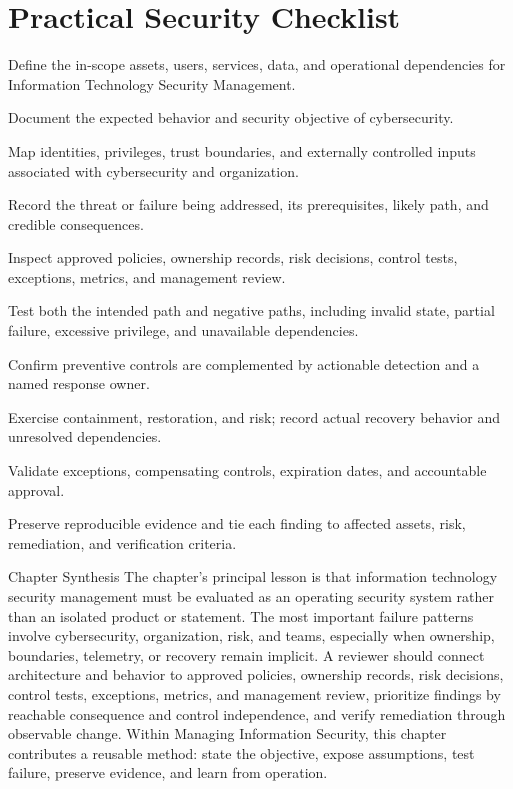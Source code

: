 \documentclass[11pt,letterpaper]{article}
\begin{document}
\section*{Practical Security Checklist}
\begin{CornellChecklist}
\item Define the in-scope assets, users, services, data, and operational dependencies for Information Technology Security Management.
\item Document the expected behavior and security objective of cybersecurity.
\item Map identities, privileges, trust boundaries, and externally controlled inputs associated with cybersecurity and organization.
\item Record the threat or failure being addressed, its prerequisites, likely path, and credible consequences.
\item Inspect approved policies, ownership records, risk decisions, control tests, exceptions, metrics, and management review.
\item Test both the intended path and negative paths, including invalid state, partial failure, excessive privilege, and unavailable dependencies.
\item Confirm preventive controls are complemented by actionable detection and a named response owner.
\item Exercise containment, restoration, and risk; record actual recovery behavior and unresolved dependencies.
\item Validate exceptions, compensating controls, expiration dates, and accountable approval.
\item Preserve reproducible evidence and tie each finding to affected assets, risk, remediation, and verification criteria.
\end{CornellChecklist}
\begin{CornellSummaryBox}{Chapter Synthesis}
The chapter's principal lesson is that information technology security management must be evaluated as an operating security system rather than an isolated product or statement. The most important failure patterns involve cybersecurity, organization, risk, and teams, especially when ownership, boundaries, telemetry, or recovery remain implicit. A reviewer should connect architecture and behavior to approved policies, ownership records, risk decisions, control tests, exceptions, metrics, and management review, prioritize findings by reachable consequence and control independence, and verify remediation through observable change. Within Managing Information Security, this chapter contributes a reusable method: state the objective, expose assumptions, test failure, preserve evidence, and learn from operation.
\end{CornellSummaryBox}
\end{document}

